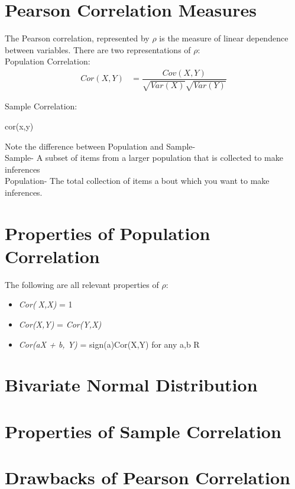 \documentclass[11pt]{article}
\begin{document}
\section{Pearson Correlation Measures}

The Pearson correlation, represented by \(\rho\) is the measure of linear dependence between variables.
There are two representations of \(\rho\): \\

Population Correlation:
\begin{align}
Cor(X,Y)
&= \dfrac{Cov(X,Y)}{\sqrt{Var(X)}\sqrt{Var(Y)}}
\end{align}

Sample Correlation:

cor(x,y)


Note the difference between Population and Sample- \\
Sample- A subset of items from a larger population that is collected to make inferences \\
Population- The total collection of items about which you want to make inferences.



\section{Properties of Population Correlation}
The following are all relevant properties of \(\rho\):

\begin{itemize}
\item \textit{Cor(X,X)} = 1
\item \textit{Cor(X,Y)} = \textit{Cor(Y,X)} 
\item \textit{Cor(aX + b, Y)} = sign(a)Cor(X,Y) for any a,b \epsilon R



\end{itemize}

\section{Bivariate Normal Distribution}
\section{Properties of Sample Correlation}
\section{Drawbacks of Pearson Correlation}
\end{document}
